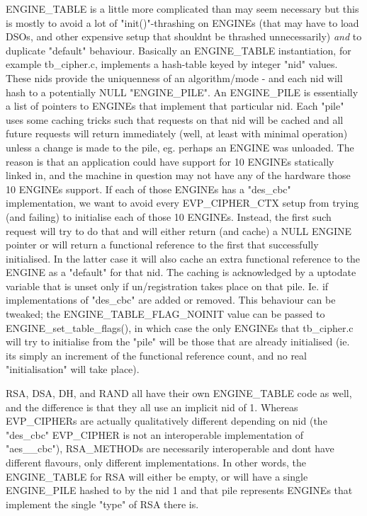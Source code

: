 ENGINE\+\_\+\+TABLE is a little more complicated than may seem necessary but this is mostly to avoid a lot of "{}init()"{}-\/thrashing on ENGINEs (that may have to load DSOs, and other expensive setup that shouldn\textquotesingle{}t be thrashed unnecessarily) {\itshape and} to duplicate "{}default"{} behaviour. Basically an ENGINE\+\_\+\+TABLE instantiation, for example tb\+\_\+cipher.\+c, implements a hash-\/table keyed by integer "{}nid"{} values. These nids provide the uniquenness of an algorithm/mode -\/ and each nid will hash to a potentially NULL "{}\+ENGINE\+\_\+\+PILE"{}. An ENGINE\+\_\+\+PILE is essentially a list of pointers to ENGINEs that implement that particular \textquotesingle{}nid\textquotesingle{}. Each "{}pile"{} uses some caching tricks such that requests on that \textquotesingle{}nid\textquotesingle{} will be cached and all future requests will return immediately (well, at least with minimal operation) unless a change is made to the pile, eg. perhaps an ENGINE was unloaded. The reason is that an application could have support for 10 ENGINEs statically linked in, and the machine in question may not have any of the hardware those 10 ENGINEs support. If each of those ENGINEs has a "{}des\+\_\+cbc"{} implementation, we want to avoid every EVP\+\_\+\+CIPHER\+\_\+\+CTX setup from trying (and failing) to initialise each of those 10 ENGINEs. Instead, the first such request will try to do that and will either return (and cache) a NULL ENGINE pointer or will return a functional reference to the first that successfully initialised. In the latter case it will also cache an extra functional reference to the ENGINE as a "{}default"{} for that \textquotesingle{}nid\textquotesingle{}. The caching is acknowledged by a \textquotesingle{}uptodate\textquotesingle{} variable that is unset only if un/registration takes place on that pile. Ie. if implementations of "{}des\+\_\+cbc"{} are added or removed. This behaviour can be tweaked; the ENGINE\+\_\+\+TABLE\+\_\+\+FLAG\+\_\+\+NOINIT value can be passed to ENGINE\+\_\+set\+\_\+table\+\_\+flags(), in which case the only ENGINEs that tb\+\_\+cipher.\+c will try to initialise from the "{}pile"{} will be those that are already initialised (ie. it\textquotesingle{}s simply an increment of the functional reference count, and no real "{}initialisation"{} will take place).

RSA, DSA, DH, and RAND all have their own ENGINE\+\_\+\+TABLE code as well, and the difference is that they all use an implicit \textquotesingle{}nid\textquotesingle{} of 1. Whereas EVP\+\_\+\+CIPHERs are actually qualitatively different depending on \textquotesingle{}nid\textquotesingle{} (the "{}des\+\_\+cbc"{} EVP\+\_\+\+CIPHER is not an interoperable implementation of "{}aes\+\_\+\_\+cbc"{}), RSA\+\_\+\+METHODs are necessarily interoperable and don\textquotesingle{}t have different flavours, only different implementations. In other words, the ENGINE\+\_\+\+TABLE for RSA will either be empty, or will have a single ENGINE\+\_\+\+PILE hashed to by the \textquotesingle{}nid\textquotesingle{} 1 and that pile represents ENGINEs that implement the single "{}type"{} of RSA there is.

